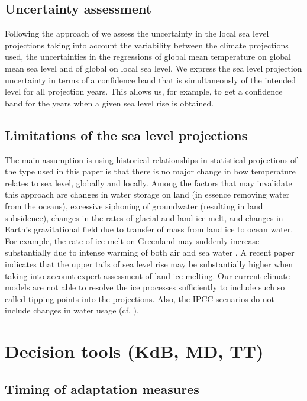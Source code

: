 \documentclass[draft,linenumbers]{agujournal}
\begin{document}
\subsection{Uncertainty assessment}
\label{unc_ass}
Following the approach of \citet{Guttorp2014} we assess the uncertainty in the local sea level projections taking into account the variability between the climate projections used, the uncertainties in the regressions of global mean temperature on global mean sea level and of global on local sea level. We express the sea level projection uncertainty in terms of a confidence band that is simultaneously of the intended  level  for all projection years. This allows us, for example, to get a confidence band for the years when a given sea level rise is obtained. 



\subsection{Limitations of the sea level projections}
The main assumption is using historical relationships in statistical projections of the type used in this paper is that there is no major change in how temperature relates to sea level, globally and locally. Among the factors that may invalidate this approach are changes in water storage on land (in essence removing water from the oceans), excessive siphoning of groundwater (resulting in land subsidence), changes in the rates of glacial and land ice melt, and changes in Earth's gravitational field due to transfer of mass from land ice to ocean water. For example, the rate of ice melt on Greenland may suddenly increase substantially due to intense warming of both air and sea water \citep{bamber2013}. A recent paper \citep{jevrejeva2016} indicates that the upper tails of sea level rise may be substantially higher when taking into account expert assessment of land ice melting. Our current climate models are not able to resolve the ice processes sufficiently to include such so called tipping points into the projections. Also, the IPCC scenarios \citep{change} do not include changes in water usage (cf. \citet{wada2012}). 

\section{Decision tools {\color{blue} (KdB, MD, TT)}}
\label{decision_tools}

\subsection{Timing of adaptation measures}
\end{document}
